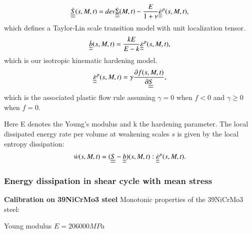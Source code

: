 \documentclass[3p,times,procedia,number]{elsarticle}
\begin{document}

\begin{equation}
	\dot{\uline{\uline{S}}}(s,M,t)=dev\dot{\uline{\uline{\Sigma}}}(M,t)-\dfrac{E}{1+\nu}\dot{\uline{\uline{\varepsilon}}}^p(s,M,t), 
\end{equation}
which defines a Taylor-Lin scale transition model with unit localization tensor\cite{Bosia201239}.
\begin{equation}
	\dot{\uline{\uline{b}}}(s,M,t)=\dfrac{kE}{E-k} \dot{\uline{\uline{\varepsilon}}}^p(s,M,t), 
\end{equation}
which is our isotropic kinematic hardening model.
\begin{equation}
	\dot{\uline{\uline{\varepsilon}}}^p(s,M,t)=\gamma\dfrac{\partial f(s,M,t)}{\partial \uline{\uline{S}}}, 
\end{equation}
which is the associated plastic flow rule assuming $\gamma=0$ when $f<0$ and  $\gamma\geqslant0$ when $f=0$.

Here E denotes the Young's modulus and k the hardening parameter. The local dissipated energy rate per volume at weakening scales $s$  is given by the local entropy dissipation:
\begin{equation}
	\dot{w}(s,M,t)=(\uline{\uline{S}}-\uline{\uline{b}})(s,M,t):\uline{\uline{\dot{\varepsilon}}}^p(s,M,t).
	\label{dissipated}
\end{equation}


\subsubsection{Energy dissipation in shear cycle with mean stress}
\textbf{Calibration on 39NiCrMo3 steel}
Monotonic properties of the 39NiCrMo3 steel:

\noindent
Young modulus $E=206000 MPa$
\end{document}
